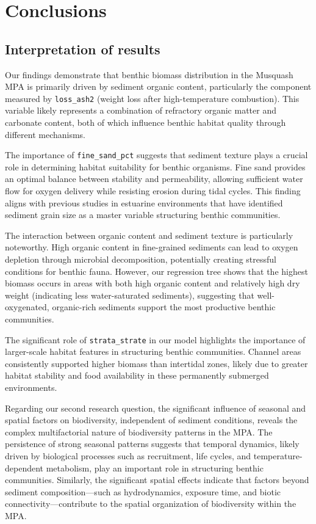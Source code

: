 \documentclass[12pt]{article}
\begin{document}
\newpage
\section{Conclusions}
\subsection{Interpretation of results}

\qquad Our findings demonstrate that benthic biomass distribution in the
Musquash MPA is primarily driven by sediment organic content, particularly the
component measured by \texttt{loss\_ash2} (weight loss after high-temperature
combustion). This variable likely represents a combination of refractory organic
matter and carbonate content, both of which influence benthic habitat quality
through different mechanisms.

\qquad The importance of \texttt{fine\_sand\_pct} suggests that sediment texture
plays a crucial role in determining habitat suitability for benthic organisms.
Fine sand provides an optimal balance between stability and permeability,
allowing sufficient water flow for oxygen delivery while resisting erosion
during tidal cycles. This finding aligns with previous studies in estuarine
environments that have identified sediment grain size as a master variable
structuring benthic communities\cite{glud2008oxygen}.

\qquad The interaction between organic content and sediment texture is
particularly noteworthy. High organic content in fine-grained sediments can lead
to oxygen depletion through microbial decomposition, potentially creating
stressful conditions for benthic fauna. However, our regression tree shows that
the highest biomass occurs in areas with both high organic content and
relatively high dry weight (indicating less water-saturated sediments),
suggesting that well-oxygenated, organic-rich sediments support the most
productive benthic communities.

\qquad The significant role of \texttt{strata\_strate} in our model highlights
the importance of larger-scale habitat features in structuring benthic
communities. Channel areas consistently supported higher biomass than intertidal
zones, likely due to greater habitat stability and food availability in these
permanently submerged environments.

\qquad Regarding our second research question, the significant influence of
seasonal and spatial factors on biodiversity, independent of sediment
conditions, reveals the complex multifactorial nature of biodiversity patterns
in the MPA. The persistence of strong seasonal patterns suggests that temporal
dynamics, likely driven by biological processes such as recruitment, life
cycles, and temperature-dependent metabolism, play an important role in
structuring benthic communities. Similarly, the significant spatial effects
indicate that factors beyond sediment composition—such as hydrodynamics,
exposure time, and biotic connectivity—contribute to the spatial organization of
biodiversity within the MPA.
\end{document}
